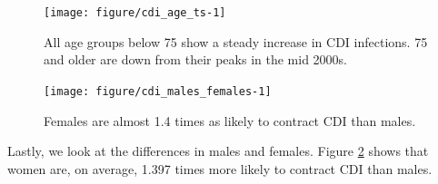 \documentclass[12pt]{ociamthesis}\usepackage[]{graphicx}\usepackage[]{color}
\newenvironment{knitrout}{}{} %
\begin{document}
\begin{knitrout}
\color{fgcolor}\begin{figure}

{\centering \texttt{[image: figure/cdi\_age\_ts-1]} 

}

\caption[All age groups below 75 show a steady increase in CDI infections]{All age groups below 75 show a steady increase in CDI infections. 75 and older are down from their peaks in the mid 2000s.}\label{fig:cdi_age_ts}
\end{figure}


\end{knitrout}
\label{fig:cdi_age_ts}

\begin{knitrout}
\color{fgcolor}\begin{figure}

{\centering \texttt{[image: figure/cdi\_males\_females-1]} 

}

\caption[Females are almost 1.4 times as likely to contract CDI than males]{Females are almost 1.4 times as likely to contract CDI than males.}\label{fig:cdi_males_females}
\end{figure}


\end{knitrout}
\label{fig:cdi_males_females}



Lastly, we look at the differences in males and females. Figure \ref{fig:cdi_males_females} shows that women are, on average,
1.397 times more likely to contract CDI than males. 








\end{document}
